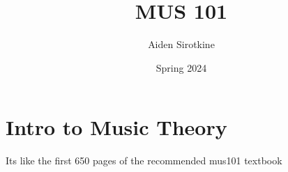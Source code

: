 \documentclass[fleqn]{report}
\date{Spring 2024}
\title{MUS 101}
\author{Aiden Sirotkine}
\begin{document}
\pagestyle{fancy}
\maketitle
\tableofcontents
\clearpage

\chapter{Intro to Music Theory}
Its like the first 650 pages of the recommended mus101 textbook
\end{document}
